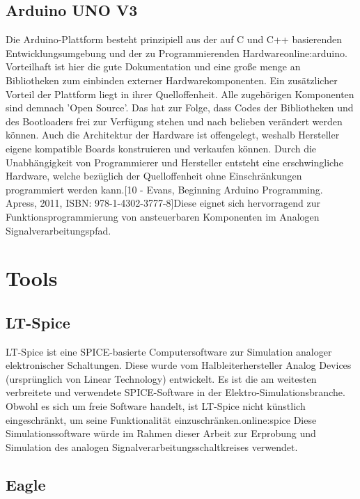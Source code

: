 \subsection{Arduino UNO V3}
\label{subsec:Unterabschnitt12}

Die Arduino-Plattform besteht prinzipiell aus der auf C und C++ basierenden Entwicklungsumgebung und der zu Programmierenden Hardware\gls{online:arduino}. Vorteilhaft ist hier die gute Dokumentation und eine große menge an Bibliotheken zum einbinden externer Hardwarekomponenten. Ein zusätzlicher Vorteil der Plattform liegt in ihrer Quelloffenheit. Alle zugehörigen Komponenten sind demnach 'Open Source'. Das hat zur Folge, dass Codes der Bibliotheken und des Bootloaders frei zur Verfügung stehen und nach belieben verändert werden können. Auch die Architektur der Hardware ist offengelegt, weshalb Hersteller eigene kompatible Boards konstruieren und verkaufen können. Durch die Unabhängigkeit von Programmierer und Hersteller entsteht eine erschwingliche Hardware, welche bezüglich der Quelloffenheit ohne Einschränkungen programmiert werden kann.[10 - Evans, Beginning Arduino Programming. Apress, 2011, ISBN: 978-1-4302-3777-8]Diese eignet sich hervorragend zur Funktionsprogrammierung von ansteuerbaren Komponenten im Analogen Signalverarbeitungspfad.

\section{Tools}       
\subsection{LT-Spice}
\label{subsec:Unterabschnitt12}
LT-Spice ist eine SPICE-basierte Computersoftware zur Simulation analoger elektronischer Schaltungen. Diese wurde vom Halbleiterhersteller Analog Devices (ursprünglich von Linear Technology) entwickelt. Es ist die am weitesten verbreitete und verwendete SPICE-Software in der Elektro-Simulationsbranche. Obwohl es sich um freie Software handelt, ist LT-Spice nicht künstlich eingeschränkt, um seine Funktionalität einzuschränken.\gls{online:spice} Diese Simulationssoftware würde im Rahmen dieser Arbeit zur Erprobung und Simulation des analogen Signalverarbeitungsschaltkreises verwendet.

\subsection{Eagle}
\label{subsec:Unterabschnitt12}


